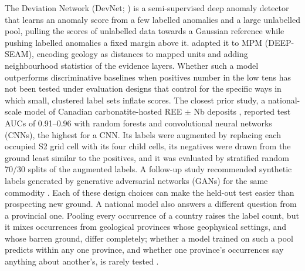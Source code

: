 \documentclass[pdflatex,sn-apa]{sn-jnl}
\begin{document}
The Deviation Network (DevNet; \citealp{Pang2019}) is a semi-supervised deep anomaly detector that learns an anomaly score from a few labelled anomalies and a large unlabelled pool, pulling the scores of unlabelled data towards a Gaussian reference while pushing labelled anomalies a fixed margin above it. \citet{Luo2026} adapted it to MPM (DEEP-SEAM), encoding geology as distances to mapped units and adding neighbourhood statistics of the evidence layers. Whether such a model outperforms discriminative baselines when positives number in the low tens has not been tested under evaluation designs that control for the specific ways in which small, clustered label sets inflate scores. The closest prior study, a national-scale model of Canadian carbonatite-hosted REE $\pm$ Nb deposits \citep{Parsa2024}, reported test AUCs of 0.91--0.96 with random forests and convolutional neural networks (CNNs), the highest for a CNN. Its labels were augmented by replacing each occupied S2 grid cell with its four child cells, its negatives were drawn from the ground least similar to the positives, and it was evaluated by stratified random 70/30 splits of the augmented labels. A follow-up study recommended synthetic labels generated by generative adversarial networks (GANs) for the same commodity \citep{Parsa2025}. Each of these design choices can make the held-out test easier than prospecting new ground. A national model also answers a different question from a provincial one. Pooling every occurrence of a country raises the label count, but it mixes occurrences from geological provinces whose geophysical settings, and whose barren ground, differ completely; whether a model trained on such a pool predicts within any one province, and whether one province's occurrences say anything about another's, is rarely tested \citep{Ploton2020,Meyer2021}.
\end{document}
